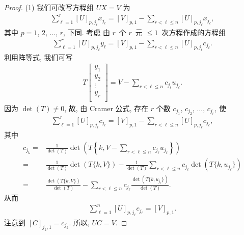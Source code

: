 \begin{proof}
    (1)
    我们可改写方程组 \(UX = V\) 为
    \begin{align*}
        \sum_{\ell = 1}^{r}
        {[U]_{p,j_\ell} x_{j_\ell}}
            = [V]_{p,1}
        - \sum_{r < \ell \leq n}
        {[U]_{p,j_\ell} x_{j_\ell}},
    \end{align*}
    其中 \(p = 1\), \(2\), \(\dots\), \(r\),
    下同.
    考虑%
    由 \(r\)~个 \(r\)~元 \({\leq} 1\)~次方程作成的方程组
    \begin{align*}
        \sum_{\ell = 1}^{r}
        {[U]_{p,j_\ell} y_\ell}
        = [V]_{p,1}
        - \sum_{r < \ell \leq n}
        {[U]_{p,j_\ell} c_{j_\ell}}.
    \end{align*}
    利用阵等式, 我们可写
    \begin{align*}
        T
        \begin{bmatrix}
            y_1    \\
            y_2    \\
            \vdots \\
            y_r    \\
        \end{bmatrix}
        =
        V -
        \sum_{r < \ell \leq n}
        {c_{j_\ell} u_{j_\ell}}.
    \end{align*}
    因为 \(\det {(T)} \neq 0\),
    故, 由 Cramer 公式,
    存在 \(r\) 个数
    \(c_{j_1}\), \(c_{j_2}\), \(\dots\), \(c_{j_r}\),
    使
    \begin{align*}
        \sum_{\ell = 1}^{r}
        {[U]_{p,j_\ell} c_{j_\ell}}
            = [V]_{p,1}
        - \sum_{r < \ell \leq n}
        {[U]_{p,j_\ell} c_{j_\ell}},
    \end{align*}
    其中
    \begin{align*}
        c_{j_k}
        = {} &
        \frac{1}{\det {(T)}}
        \det {
            \left(
            T\left\{
            k,
            V -
            \sum_{r < \ell \leq n}
            {c_{j_\ell} u_{j_\ell}}
            \right\}
            \right)
        }
        \\
        = {} &
        \frac{1}{\det {(T)}} \det {(T\{k,V\})}
        -
        \frac{1}{\det {(T)}}
        \sum_{r < \ell \leq n}
        {c_{j_\ell}
        \det {(T\{k,u_{j_\ell}\})}
        }
        \\
        = {} &
        \frac{\det {(T\{k,V\})}}{\det {(T)}}
        - \sum_{r < \ell \leq n}
        {c_{j_\ell}
        \frac{\det {(T\{k,u_{j_\ell}\})}}{\det {(T)}}}.
    \end{align*}
    从而
    \begin{align*}
        \sum_{\ell = 1}^{n}
        {[U]_{p,j_\ell} c_{j_\ell}}
            = [V]_{p,1}.
    \end{align*}
    注意到 \([C]_{j_k,1} = c_{j_k}\).
    所以, \(UC = V\).


\end{proof}

